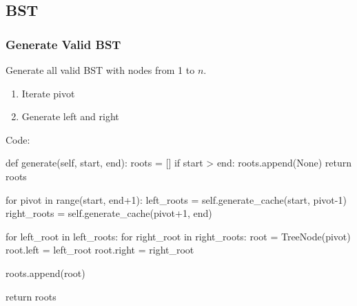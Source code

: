 \subsection{BST}
\subsubsection{Generate Valid BST}
Generate all valid BST with nodes from 1 to $n$.
\begin{enumerate}
\item Iterate pivot
\item Generate left and right
\end{enumerate}
Code:
\begin{python}
def generate(self, start, end):
  roots = []
  if start > end:
    roots.append(None)
    return roots

  for pivot in range(start, end+1):
    left_roots = self.generate_cache(start, pivot-1)
    right_roots = self.generate_cache(pivot+1, end)
    
    for left_root in left_roots:
      for right_root in right_roots:
        root = TreeNode(pivot)
        root.left = left_root
        root.right = right_root

        roots.append(root)

  return roots 

\end{python}


